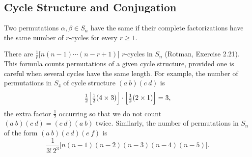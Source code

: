 \subsection{Cycle Structure and Conjugation}

\begin{definition}
	Two permutations \(\alpha, \beta \in S_n\) have the same  if
	their complete factorizations have the same number of \(r\)-cycles for every
	\(r \geq 1\).
\end{definition}

There are \(\tfrac{1}{r}\bigl[n(n-1)\cdots(n-r+1)\bigr]\) \(r\)-cycles in \(S_n\)
(Rotman, Exercise 2.21). This formula counts permutations of a given cycle
structure, provided one is careful when several cycles have the same length. For example,
the number of permutations in \(S_4\) of cycle structure \((a\ b)(c\ d)\) is
\[
	\tfrac{1}{2}\Bigl[\tfrac{1}{2}(4\times 3)\Bigr]\cdot\Bigl[\tfrac{1}{2}(2 \times 1)\Bigr] = 3,
\]
the extra factor \(\tfrac{1}{2}\) occurring so that we do not count
\((a\ b)(c\ d) = (c\ d)(a\ b)\) twice. Similarly, the number of permutations in \(S_n\) of
the form \((a\ b)(c\ d)(e\ f)\) is
\[
	\frac{1}{3!\,2^3}\bigl[n(n-1)(n-2)(n-3)(n-4)(n-5)\bigr].
\]

